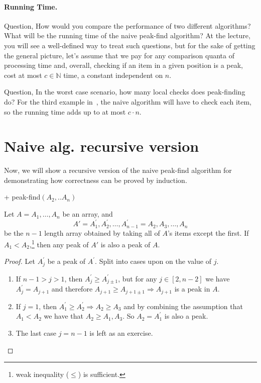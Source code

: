 \paragraph{Running Time.} Question, How would you compare the performance of two different algorithms? What will be the running time of the naive peak-find algorithm? At the lecture, you will see a well-defined way to treat such questions, but for the sake of getting the general picture, let's assume that we pay for any comparison quanta of processing time and, overall, checking if an item in a given position is a peak, cost at most $c\in \mathbb{N}$ time, a constant independent on $n$.

Question, In the worst case scenario, how many local checks does peak-finding do? For the third example in~, the naive algorithm will have to check each item, so the running time adds up to at most $c \cdot n$.

\section{Naive alg. recursive version}
Now, we will show a recursive version of the naive peak-find algorithm for demonstrating how correctness can be proved by induction. 
\begin{algorithm}[h]
\caption{naive recursive peak-find alg.}
  + peak-find$(A_{2}, .. A_{n})$
 \end{algorithm}

 \begin{claim} \label{claim:subarray} 
   Let $A = A_1, \dots, A_n$ be an array, and $$A' = A^{\prime}_1, A^{\prime}_2, \dots, A^{\prime}_{n-1} =  A_2, A_3, \dots, A_n$$ be the $n-1$ length array obtained by taking all of $A$'s items except the first. If $A_1 < A_2$,\footnote{ weak inequality ($\le$) is sufficient.} then any peak of $A'$ is also a peak of $A$.
\end{claim}
\begin{proof} 
Let $A^{\prime}_{j}$ be a peak of $A^{\prime}$. Split into cases upon on the value of $j$.

\begin{enumerate}
  \item If $n-1 > j > 1$, then $A^{\prime}_{j} \ge A^{\prime}_{j \pm 1}$, but for any $j \in [2, n-2]$ we have $A^{\prime}_{j} = A_{j+1}$ and therefore $A_{j+1} \ge A_{j+1 \pm 1} \Rightarrow A_{j+1}$ is a peak in $A$.
  \item If $j = 1$, then $A^{\prime}_{1} \ge A^{\prime}_{2} \Rightarrow A_{2} \ge A_{3}$ and by combining the assumption that $A_{1} < A_{2}$ we have that $A_{2} \ge A_{1}, A_{3}$. So $A_{2} = A^{\prime}_{1}$ is also a peak.
  \item The last case $j = n-1$ is left as an exercise.
\end{enumerate}
\end{proof}

